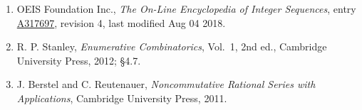\documentclass[11pt]{article}
\theoremstyle{definition}
\begin{document}
\begin{enumerate}

\item OEIS Foundation Inc., \emph{The On-Line Encyclopedia of Integer Sequences}, entry \href{https://oeis.org/A317697}{A317697}, revision 4, last modified Aug 04 2018.

\item R. P. Stanley, \emph{Enumerative Combinatorics}, Vol.~1, 2nd ed., Cambridge University Press, 2012; \S4.7.

\item J. Berstel and C. Reutenauer, \emph{Noncommutative Rational Series with Applications}, Cambridge University Press, 2011.

\end{enumerate}
\end{document}
